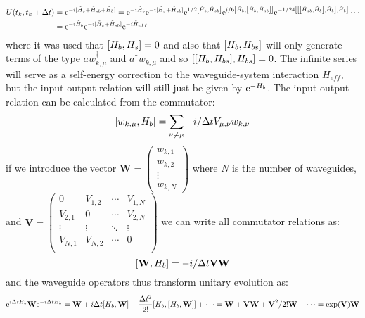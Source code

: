 \begin{align}
    U(t_k,t_k+\Delta t) &= \mathrm{e}^{ -i [ \Tilde{H}_s + \Tilde{H}_{sb} + \Tilde{H}_b ]} = \mathrm{e}^{ -i \Tilde{H}_b } \mathrm{e}^{ -i [ \Tilde{H}_{s} + \Tilde{H}_{sb}]} \mathrm{e}^{ 1/2 \comm{\Tilde{H}_b}{\Tilde{H}_{sb}}} \mathrm{e}^{ i/6  \comm{\Tilde{H}_b}{\comm{\Tilde{H}_b}{\Tilde{H}_{sb}}}} \mathrm{e}^{ -1/24 \comm{\comm{\comm{\Tilde{H}_{sb}}{\Tilde{H}_b}}{\Tilde{H}_b}}{\Tilde{H}_b}}\cdots \\
    &= \mathrm{e}^{ -i \Tilde{H}_b } \mathrm{e}^{ -i [ \Tilde{H}_{s} + \Tilde{H}_{sb}]} \mathrm{e}^{-i \Tilde{H}_{eff}} 
\end{align}
where it was used that $\comm{H_b}{H_s} = 0$ and also that $\comm{H_b}{H_{bs}}$ will only generate terms of the type $a w_{k,\mu}^\dagger$ and $a^\dagger w_{k,\mu}$ and so  $\comm{\comm{H_b}{H_{bs}}}{H_{bs}} = 0$. The infinite series will serve as a self-energy correction to the waveguide-system interaction $H_{eff}$, but the input-output relation will still just be given by $\mathrm{e}^{-\Tilde{H_b}}$. The input-output relation can be calculated from the commutator:
\begin{equation}
    \comm{w_{k,\mu}}{H_b} = \sum_{\nu \neq \mu} - i/\Delta t V_{\mu,\nu} w_{k,\nu}
\end{equation}
if we introduce the vector $\textbf{W} = \begin{pmatrix}
    w_{k,1} \\ w_{k,2} \\ \vdots \\ w_{k,N}
\end{pmatrix}$ where $N$ is the number of waveguides, and $\textbf{V} = \begin{pmatrix}
    0 & V_{1,2} & \cdots & V_{1,N} \\
    V_{2,1} & 0 & \cdots & V_{2,N} \\
     \vdots & \vdots & \ddots & \vdots \\
     V_{N,1} & V_{N,2} & \cdots & 0 \\
\end{pmatrix}$ we can write all commutator relations as:
\begin{equation}
    \comm{\textbf{W}}{H_b} = - i/\Delta t \textbf{V} \textbf{W}
\end{equation}
and the waveguide operators thus transform unitary evolution as:
\begin{equation}
    \mathrm{e}^{i \Delta t H_b} \textbf{W} \mathrm{e}^{-i \Delta t H_b} = \textbf{W} + i \Delta t\comm{H_b}{\textbf{W}} - \frac{\Delta t^2}{2!} \comm{H_b}{\comm{H_b}{\textbf{W}}} + \cdots = \textbf{W} + \textbf{V} \textbf{W} + \textbf{V}^2/2! \textbf{W} + \cdots = \exp(\textbf{V}) \textbf{W}  
\end{equation}
